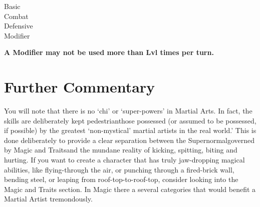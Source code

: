 \documentclass[twoside]{book}
\begin{document}
\begin{description}
    
  \item[ Basic ] 
  \item[ Combat ] 
  \item[ Defensive ] 
  \item[ Modifier ] 
\end{description}
  

 \textbf{ A Modifier may not be used more than Lvl times per
             turn. }


  

  

  
    

\section{Further Commentary}
    
    {  
      You will note that there is no `chi' or
             `super-powers' in Martial Arts. In fact, the
             skills are deliberately kept pedestrianthose
             possessed (or assumed to be possessed, if possible) by the
             greatest `non-mystical' martial artists in the
             real world.' This is done deliberately to
             provide a clear separation between the
             Supernormalgoverned by Magic and Traitsand the
             mundane reality of kicking, spitting, biting and hurting. If
             you want to create a character that has truly jaw-dropping
             magical abilities, like flying-through the air, or punching
             through a fired-brick wall, bending steel, or leaping from
             roof-top-to-roof-top, consider looking into the Magic and
             Traits section. In Magic there a several categories that
             would benefit a Martial Artist tremondously. 
    }
  
    
\end{document}
